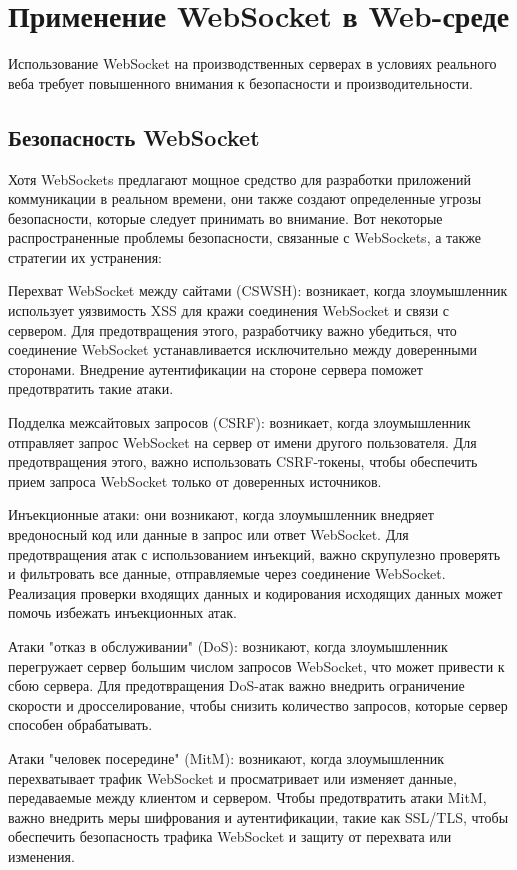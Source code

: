 \chapter{Применение WebSocket в Web-среде}

Использование WebSocket на производственных серверах в условиях реального веба требует повышенного внимания к безопасности и производительности.

\section{Безопасность WebSocket}

Хотя WebSockets предлагают мощное средство для разработки приложений коммуникации в реальном времени, они также создают определенные угрозы безопасности, которые следует принимать во внимание. Вот некоторые распространенные проблемы безопасности, связанные с WebSockets, а также стратегии их устранения:

Перехват WebSocket между сайтами (CSWSH): возникает, когда злоумышленник использует уязвимость XSS для кражи соединения WebSocket и связи с сервером. Для предотвращения этого, разработчику важно убедиться, что соединение WebSocket устанавливается исключительно между доверенными сторонами. Внедрение аутентификации на стороне сервера поможет предотвратить такие атаки.

Подделка межсайтовых запросов (CSRF): возникает, когда злоумышленник отправляет запрос WebSocket на сервер от имени другого пользователя. Для предотвращения этого, важно использовать CSRF-токены, чтобы обеспечить прием запроса WebSocket только от доверенных источников.

Инъекционные атаки: они возникают, когда злоумышленник внедряет вредоносный код или данные в запрос или ответ WebSocket. Для предотвращения атак с использованием инъекций, важно скрупулезно проверять и фильтровать все данные, отправляемые через соединение WebSocket. Реализация проверки входящих данных и кодирования исходящих данных может помочь избежать инъекционных атак.

Атаки "отказ в обслуживании" (DoS): возникают, когда злоумышленник перегружает сервер большим числом запросов WebSocket, что может привести к сбою сервера. Для предотвращения DoS-атак важно внедрить ограничение скорости и дросселирование, чтобы снизить количество запросов, которые сервер способен обрабатывать.

Атаки "человек посередине" (MitM): возникают, когда злоумышленник перехватывает трафик WebSocket и просматривает или изменяет данные, передаваемые между клиентом и сервером. Чтобы предотвратить атаки MitM, важно внедрить меры шифрования и аутентификации, такие как SSL/TLS, чтобы обеспечить безопасность трафика WebSocket и защиту от перехвата или изменения.

